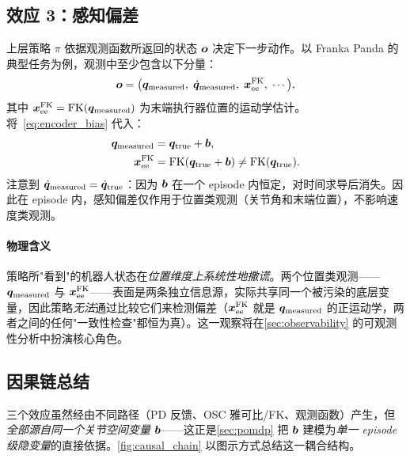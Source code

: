 \subsection{效应 3：感知偏差}\label{subsec:effect3}

上层策略 $\pi$ 依据观测函数所返回的状态 $\bm{o}$ 决定下一步动作。以 Franka Panda 的典型任务为例，观测中至少包含以下分量：
\begin{equation}
  \bm{o} = \big(\bm{q}_{\text{measured}},\; \dot{\bm{q}}_{\text{measured}},\; \bm{x}_{\text{ee}}^{\text{FK}},\; \cdots\big),
  \label{eq:obs_structure}
\end{equation}
其中 $\bm{x}_{\text{ee}}^{\text{FK}} = \text{FK}(\bm{q}_{\text{measured}})$ 为末端执行器位置的运动学估计。将~\cref{eq:encoder_bias} 代入：
\begin{align}
  \bm{q}_{\text{measured}} &= \bm{q}_{\text{true}} + \bm{b}, \label{eq:obs_q_bias}\\
  \bm{x}_{\text{ee}}^{\text{FK}} &= \text{FK}(\bm{q}_{\text{true}} + \bm{b}) \neq \text{FK}(\bm{q}_{\text{true}}).
  \label{eq:obs_x_bias}
\end{align}
注意到 $\dot{\bm{q}}_{\text{measured}} = \dot{\bm{q}}_{\text{true}}$：因为 $\bm{b}$ 在一个 episode 内恒定，对时间求导后消失。因此在 episode 内，感知偏差仅作用于位置类观测（关节角和末端位置），不影响速度类观测。

\paragraph{物理含义} 策略所"看到"的机器人状态在\emph{位置维度上系统性地撒谎}。两个位置类观测——$\bm{q}_{\text{measured}}$ 与 $\bm{x}_{\text{ee}}^{\text{FK}}$——表面是两条独立信息源，实际共享同一个被污染的底层变量，因此策略\emph{无法}通过比较它们来检测偏差（$\bm{x}_{\text{ee}}^{\text{FK}}$ 就是 $\bm{q}_{\text{measured}}$ 的正运动学，两者之间的任何"一致性检查"都恒为真）。这一观察将在\cref{sec:observability} 的可观测性分析中扮演核心角色。

\subsection{因果链总结}\label{subsec:causal_summary}

三个效应虽然经由不同路径（PD 反馈、OSC 雅可比/FK、观测函数）产生，但\emph{全部源自同一个关节空间变量 $\bm{b}$}——这正是\cref{sec:pomdp} 把 $\bm{b}$ 建模为\emph{单一 episode 级隐变量}的直接依据。\cref{fig:causal_chain} 以图示方式总结这一耦合结构。

